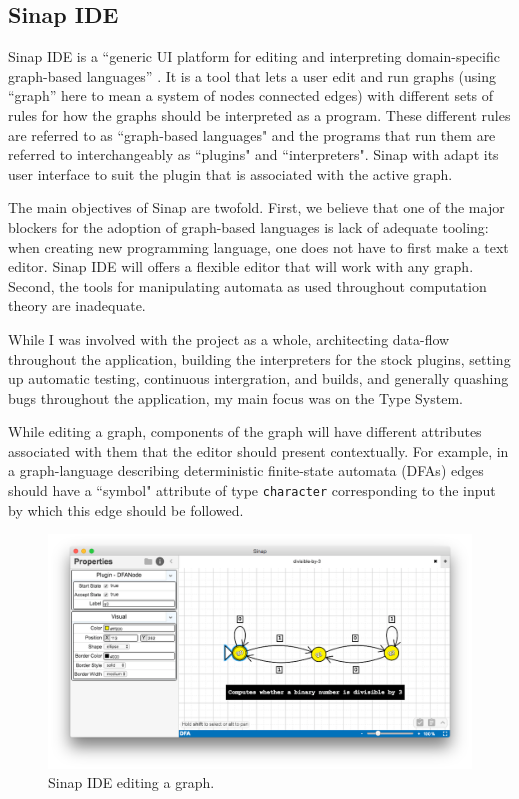 \documentclass[12pt]{article}
\begin{document}
\subsection{Sinap IDE}

Sinap IDE is a ``generic UI platform 
for editing and interpreting domain-specific graph-based languages''
\cite{sinap-ide}. It is a tool that lets a user edit and run graphs
(using ``graph'' here to mean a system of nodes connected edges) with
different sets of rules for how the graphs should be interpreted as a
program. These different rules are referred to as ``graph-based languages"
and the programs that run them are referred to interchangeably as 
``plugins" and ``interpreters". Sinap with adapt its user interface to 
suit the plugin that is associated with the active graph. 

The main objectives of Sinap are twofold. First, we believe that one
of the major blockers for the adoption of graph-based languages is 
lack of adequate tooling: when creating new programming language,
one does not have to first make a text editor. Sinap IDE will 
offers a flexible editor that will work with any graph. Second, 
the tools for manipulating automata as used throughout computation 
theory are inadequate. 

While I was involved with the project as a whole, architecting 
data-flow throughout the application, building the interpreters
for the stock plugins, setting up automatic testing, continuous 
intergration, and builds, and generally quashing bugs throughout
the application, my main focus was on the Type System. 

While editing a graph, components of the
graph will have different attributes associated with them 
that the editor should present contextually. For example, in
a graph-language describing deterministic finite-state 
automata (DFAs) edges should have a ``symbol" attribute of 
type \texttt{character} corresponding to the input by which this 
edge should be followed. 

\begin{figure}
    \centering
    \includegraphics[width=.8\textwidth]{sinap-screenshot}
    \caption{Sinap IDE editing a graph.}
    \label{sinap-screenshot}  
\end{figure}
\end{document}
